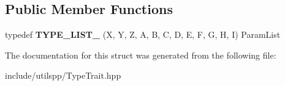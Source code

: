 \subsection*{Public Member Functions}
\begin{DoxyCompactItemize}
\item 
\hypertarget{structutilspp_1_1PointerOnMemberFunction_3_01W_07V_1_1_5_08_07X_00_01Y_00_01Z_00_01A_00_01B_00_0bbd85fb2705c5ddb5a380fdcfc065534_a5fff4d9edc6988a7a37dcca2c5ab5a4d}{typedef {\bfseries T\-Y\-P\-E\-\_\-\-L\-I\-S\-T\-\_} (X, Y, Z, A, B, C, D, E, F, G, H, I) Param\-List}\label{structutilspp_1_1PointerOnMemberFunction_3_01W_07V_1_1_5_08_07X_00_01Y_00_01Z_00_01A_00_01B_00_0bbd85fb2705c5ddb5a380fdcfc065534_a5fff4d9edc6988a7a37dcca2c5ab5a4d}

\end{DoxyCompactItemize}


The documentation for this struct was generated from the following file\-:\begin{DoxyCompactItemize}
\item 
include/utilspp/Type\-Trait.\-hpp\end{DoxyCompactItemize}
